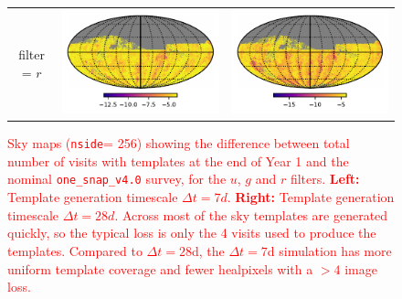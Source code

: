 \documentclass[preprintm,linenumbers]{aastex631}
\newcommand{\baseline}{\texttt{one\_snap\_v4.0}\xspace}
\newcommand{\nside}{\texttt{nside}\xspace}
\providecommand{\red}[1]{\textcolor{red}{#1}}
\begin{document}
\begin{figure}
\begin{tabular}{@{}c@{}c@{}c@{}}
				filter = $r$ & \includegraphics[align=t]{results/skymaps/skymaps_delta_first_year_one_snap_v4_0_10yrs_db_noDD_noTwi_CountMetric_doAllTemplateMetrics_reduceCount_r_7_noDD_noTwi} &			
				\includegraphics[align=t]{results/skymaps/skymaps_delta_first_year_one_snap_v4_0_10yrs_db_noDD_noTwi_CountMetric_doAllTemplateMetrics_reduceCount_r_28_noDD_noTwi} \\				
			\end{tabular}
			\caption{
            \red{Sky maps (\nside = 256) showing the  difference between total number of visits with templates at the end of Year 1 and the nominal \baseline survey, for the $u$, $g$ and $r$ filters. \textbf{Left:} Template generation timescale $\Delta t = 7 \si{d}$.  \textbf{Right:} Template generation timescale $\Delta t = 28 \si{d}$. Across most of the sky templates are generated quickly, so the typical loss is only the 4 visits used to produce the templates. 
   Compared to $\Delta t = 28$d, the $\Delta t = 7$d simulation has more uniform template coverage and fewer healpixels with a $>4$ image loss.}
			}
			\label{appendixd:1}
		\end{figure}
        
\end{document}
